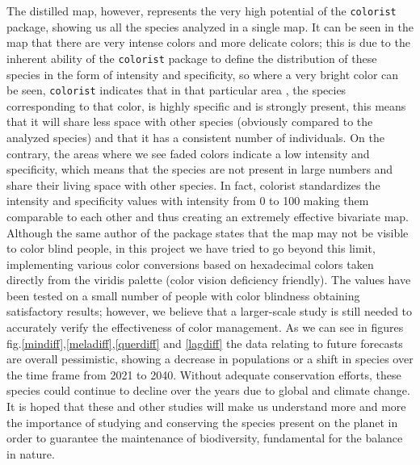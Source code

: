 \documentclass[12pt,a4paper]{article}
\begin{document}
The distilled map, however, represents the very high potential of the \texttt{colorist} package, showing us all the species analyzed in a single map. It can be seen in the map that there are very intense colors and more delicate colors; this is due to the inherent ability of the \texttt {colorist} package to define the distribution of these species in the form of intensity and specificity, so where a very bright color can be seen, \texttt {colorist} indicates that in that particular area , the species corresponding to that color, is highly specific and is strongly present, this means that it will share less space with other species (obviously compared to the analyzed species) and that it has a consistent number of individuals.
On the contrary, the areas where we see faded colors indicate a low intensity and specificity, which means that the species are not present in large numbers and share their living space with other species.
In fact, colorist standardizes the intensity and specificity values with intensity from 0 to 100 making them comparable to each other and thus creating an extremely effective bivariate map.
Although the same author of the package states that the map may not be visible to color blind people\citep{colo}, in this project we have tried to go beyond this limit, implementing various color conversions based on hexadecimal colors taken directly from the viridis palette (color vision deficiency friendly)\citep{viridis}.
The values have been tested on a small number of people with color blindness obtaining satisfactory results; however, we believe that a larger-scale study is still needed to accurately verify the effectiveness of color management.
As we can see in figures fig.\ref{mindiff},\ref{meladiff},\ref{querdiff} and \ref{lagdiff} the data relating to future forecasts are overall pessimistic, showing a decrease in populations or a shift in species over the time frame from 2021 to 2040.
 Without adequate conservation efforts, these species could continue to decline over the years due to global and climate change.
It is hoped that these and other studies will make us understand more and more the importance of studying and conserving the species present on the planet in order to guarantee the maintenance of biodiversity, fundamental for the balance in nature.
\vspace{3cm}
\end{document}
